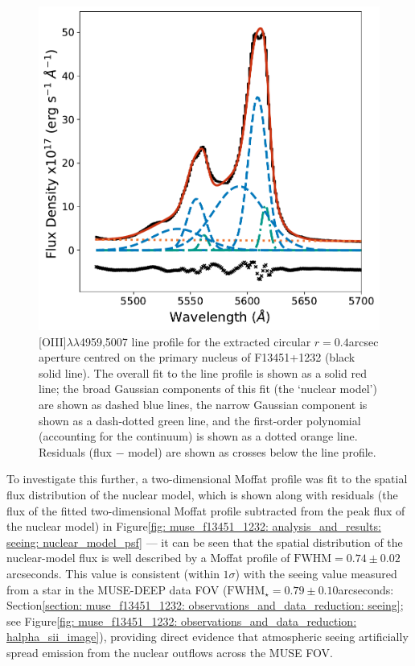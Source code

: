 \begin{figure}
    \centering
    \includegraphics[width=0.7\linewidth]{figures/muse_f13451_1232/nuclear_model.pdf}
    \caption[{[}OIII{]}$\lambda\lambda$4959,5007 line profile (and nuclear model fit) for the primary nucleus of F13451+1232]{[OIII]$\lambda\lambda$4959,5007 line profile for the extracted circular $r=0.4$\;arcsec aperture centred on the primary nucleus of F13451+1232 (black solid line). The overall fit to the line profile is shown as a solid red line; the broad Gaussian components of this fit (the `nuclear model') are shown as dashed blue lines, the narrow Gaussian component is shown as a dash-dotted green line, and the first-order polynomial (accounting for the continuum) is shown as a dotted orange line. Residuals (flux $-$ model) are shown as crosses below the line profile.}
    \label{fig: muse_f13451_1232: analysis_and_results: seeing: nuclear_aperture_spectrum}
\end{figure}

\vspace*{\fill}

\newpage

 To investigate this further, a two-dimensional Moffat profile was fit to the spatial flux distribution of the nuclear model, which is shown along with residuals (the flux of the fitted two-dimensional Moffat profile subtracted from the peak flux of the nuclear model) in Figure\;\ref{fig: muse_f13451_1232: analysis_and_results: seeing: nuclear_model_psf} --- it can be seen that the spatial distribution of the nuclear-model flux is well described by a Moffat profile of $\mathrm{FWHM}=0.74\pm0.02$ arcseconds. This value is consistent (within $1\sigma$) with the seeing value measured from a star in the MUSE-DEEP data FOV ($\mathrm{FWHM}_\star=0.79\pm0.10$\;arcseconds: Section\;\ref{section: muse_f13451_1232: observations_and_data_reduction: seeing}; see Figure\;\ref{fig: muse_f13451_1232: observations_and_data_reduction: halpha_sii_image}), providing direct evidence that atmospheric seeing artificially spread emission from the nuclear outflows across the MUSE FOV.

